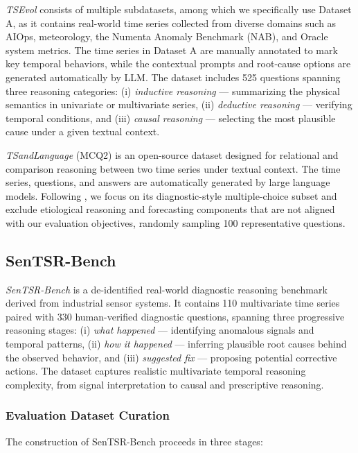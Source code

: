 \documentclass[twoside]{article}
\begin{document}
\textit{TSEvol} \citep{xie2024chatts} consists of multiple subdatasets, among which we specifically use Dataset A, as it contains real-world time series collected from diverse domains such as AIOps, meteorology, the Numenta Anomaly Benchmark (NAB), and Oracle system metrics. The time series in Dataset A are manually annotated to mark key temporal behaviors, while the contextual prompts and root-cause options are generated automatically by LLM. The dataset includes 525 questions spanning three reasoning categories: (i) \emph{inductive reasoning} — summarizing the physical semantics in univariate or multivariate series, (ii) \emph{deductive reasoning} — verifying temporal conditions, and (iii) \emph{causal reasoning} — selecting the most plausible cause under a given textual context.

\textit{TSandLanguage} (MCQ2) \citep{merrill2024language} is an open-source dataset designed for relational and comparison reasoning between two time series under textual context. The time series, questions, and answers are automatically generated by large language models. Following \cite{xie2024chatts}, we focus on its diagnostic-style multiple-choice subset and exclude etiological reasoning and forecasting components that are not aligned with our evaluation objectives, randomly sampling 100 representative questions.


\subsection{SenTSR-Bench}

\textit{SenTSR-Bench} is a de-identified real-world diagnostic reasoning benchmark derived from industrial sensor systems. It contains 110 multivariate time series paired with 330 human-verified diagnostic questions, spanning three progressive reasoning stages: (i) \emph{what happened} — identifying anomalous signals and temporal patterns, (ii) \emph{how it happened} — inferring plausible root causes behind the observed behavior, and (iii) \emph{suggested fix} — proposing potential corrective actions. The dataset captures realistic multivariate temporal reasoning complexity, from signal interpretation to causal and prescriptive reasoning.

\subsubsection{Evaluation Dataset Curation}
\label{app:curation}
The construction of SenTSR-Bench proceeds in three stages:
\end{document}
